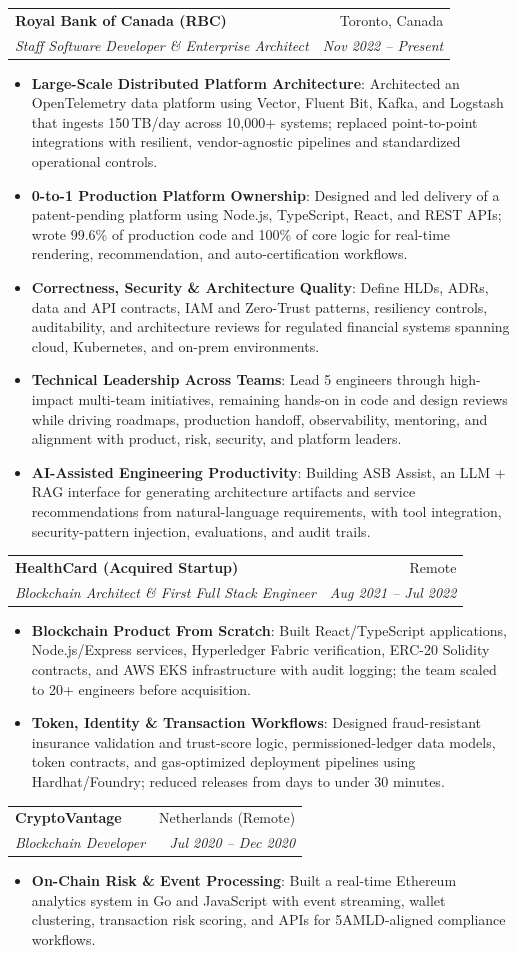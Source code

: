 \documentclass[letterpaper,9.5pt]{article}
\makeatletter
\newcommand{\resumeItem}[2]{\item\small{\textbf{#1}{: #2 \vspace{-2pt}}}}
\newcommand{\resumeSubheading}[4]{\vspace{-2pt}\item\begin{tabular*}{0.97\textwidth}{l@{\extracolsep{\fill}}r}\textbf{#1} & #2 \\\textit{\small#3} & \textit{\small #4} \\\end{tabular*}\vspace{-6pt}}
\newcommand{\resumeItemListStart}{\begin{itemize}}
\newcommand{\resumeItemListEnd}{\end{itemize}\vspace{-6pt}}
\makeatother
\begin{document}
  \resumeSubheading
    {Royal Bank of Canada (RBC)}{Toronto, Canada}
    {Staff Software Developer \& Enterprise Architect}{Nov 2022 -- Present}
  \resumeItemListStart
    \resumeItem{Large-Scale Distributed Platform Architecture}
      {Architected an OpenTelemetry data platform using Vector, Fluent Bit, Kafka, and Logstash that ingests 150\,TB/day across 10,000+ systems; replaced point-to-point integrations with resilient, vendor-agnostic pipelines and standardized operational controls.}
    \resumeItem{0-to-1 Production Platform Ownership}
      {Designed and led delivery of a patent-pending platform using Node.js, TypeScript, React, and REST APIs; wrote 99.6\% of production code and 100\% of core logic for real-time rendering, recommendation, and auto-certification workflows.}
    \resumeItem{Correctness, Security \& Architecture Quality}
      {Define HLDs, ADRs, data and API contracts, IAM and Zero-Trust patterns, resiliency controls, auditability, and architecture reviews for regulated financial systems spanning cloud, Kubernetes, and on-prem environments.}
    \resumeItem{Technical Leadership Across Teams}
      {Lead 5 engineers through high-impact multi-team initiatives, remaining hands-on in code and design reviews while driving roadmaps, production handoff, observability, mentoring, and alignment with product, risk, security, and platform leaders.}
    \resumeItem{AI-Assisted Engineering Productivity}
      {Building ASB Assist, an LLM + RAG interface for generating architecture artifacts and service recommendations from natural-language requirements, with tool integration, security-pattern injection, evaluations, and audit trails.}
  \resumeItemListEnd

  \resumeSubheading
    {HealthCard (Acquired Startup)}{Remote}
    {Blockchain Architect \& First Full Stack Engineer}{Aug 2021 -- Jul 2022}
  \resumeItemListStart
    \resumeItem{Blockchain Product From Scratch}
      {Built React/TypeScript applications, Node.js/Express services, Hyperledger Fabric verification, ERC-20 Solidity contracts, and AWS EKS infrastructure with audit logging; the team scaled to 20+ engineers before acquisition.}
    \resumeItem{Token, Identity \& Transaction Workflows}
      {Designed fraud-resistant insurance validation and trust-score logic, permissioned-ledger data models, token contracts, and gas-optimized deployment pipelines using Hardhat/Foundry; reduced releases from days to under 30 minutes.}
  \resumeItemListEnd

  \resumeSubheading
    {CryptoVantage}{Netherlands (Remote)}
    {Blockchain Developer}{Jul 2020 -- Dec 2020}
  \resumeItemListStart
    \resumeItem{On-Chain Risk \& Event Processing}
      {Built a real-time Ethereum analytics system in Go and JavaScript with event streaming, wallet clustering, transaction risk scoring, and APIs for 5AMLD-aligned compliance workflows.}
  \resumeItemListEnd
\end{document}
